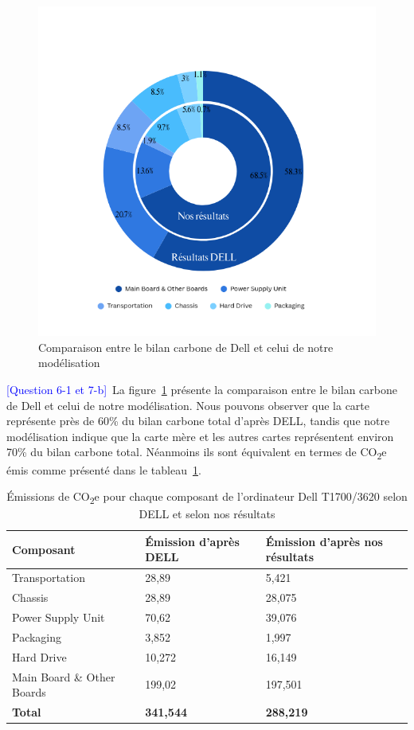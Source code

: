 \documentclass[12pt,a4paper]{paper}
\begin{document}
\begin{figure}[H]%
    \centering
    \includegraphics[width=\linewidth]{img/graph-dell-vs-our.png}
    \caption{Comparaison entre le bilan carbone de Dell et celui de notre modélisation}
    \label{fig:computer-impact}
\end{figure}
\textcolor{blue}{[Question 6-1 et 7-b]}~La figure~\ref{fig:computer-impact} présente la comparaison entre le bilan carbone de Dell et celui de notre modélisation. Nous pouvons observer que la carte représente près de 60\% du bilan carbone total d'après DELL, tandis que notre modélisation indique que la carte mère et les autres cartes représentent environ 70\% du bilan carbone total. Néanmoins ils sont équivalent en termes de CO\textsubscript{2}e émis comme présenté dans le tableau~\ref{tab:emissions}.\\
\begin{table}[H]
    \centering
    \begin{tabular}{|p{2.5cm}|p{2.4cm}|p{2.4cm}|}
    \hline
    \textbf{Composant} & \textbf{Émission d'après DELL} & \textbf{Émission d'après nos résultats} \\
    \hline
    Transportation & 28{,}89 & 5{,}421 \\ \hline
    Chassis & 28{,}89 & 28{,}075 \\ \hline
    Power Supply Unit & 70{,}62 & 39{,}076 \\ \hline
    Packaging & 3{,}852 & 1{,}997 \\ \hline
    Hard Drive & 10{,}272 & 16{,}149 \\ \hline
    Main Board \& Other Boards & 199{,}02 & 197{,}501 \\
    \hline
    \textbf{Total} & \textbf{341{,}544} & \textbf{288{,}219} \\
    \hline
    \end{tabular}
    \caption{Émissions de CO\textsubscript{2}e pour chaque composant de l'ordinateur Dell T1700/3620 selon DELL et selon nos résultats}
    \label{tab:emissions}
\end{table}
\end{document}

